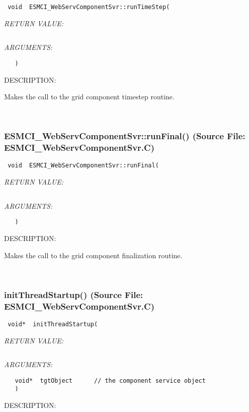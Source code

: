   
\begin{verbatim} void  ESMCI_WebServComponentSvr::runTimeStep(\end{verbatim}{\em RETURN VALUE:}
\begin{verbatim} \end{verbatim}{\em ARGUMENTS:}
\begin{verbatim}   )\end{verbatim}
{\sf DESCRIPTION:\\ }


      Makes the call to the grid component timestep routine.
   
 
\mbox{}\hrulefill\
 
\subsubsection{ESMCI\_WebServComponentSvr::runFinal() (Source File: ESMCI\_WebServComponentSvr.C)}


  
\begin{verbatim} void  ESMCI_WebServComponentSvr::runFinal(\end{verbatim}{\em RETURN VALUE:}
\begin{verbatim} \end{verbatim}{\em ARGUMENTS:}
\begin{verbatim}   )\end{verbatim}
{\sf DESCRIPTION:\\ }


      Makes the call to the grid component finalization routine.
   
 
\mbox{}\hrulefill\
 
\subsubsection{initThreadStartup() (Source File: ESMCI\_WebServComponentSvr.C)}


  
\begin{verbatim} void*  initThreadStartup(\end{verbatim}{\em RETURN VALUE:}
\begin{verbatim} \end{verbatim}{\em ARGUMENTS:}
\begin{verbatim}   void*  tgtObject      // the component service object
   )\end{verbatim}
{\sf DESCRIPTION:\\ }


